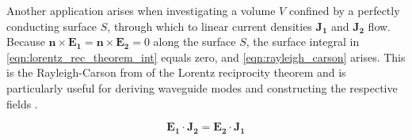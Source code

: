 Another application arises when investigating a volume $V$ confined by a perfectly conducting surface $S$, through which to linear current densities $\mathbf{J_1}$ and $\mathbf{J_2}$ flow. Because $\mathbf{n}\times\mathbf{E_1}=\mathbf{n}\times\mathbf{E_2}=0$ along the surface $S$, the surface integral in \autoref{eqn:lorentz_rec_theorem_int} equals zero, and \autoref{eqn:rayleigh_carson} arises. This is the Rayleigh-Carson from of the Lorentz reciprocity theorem and is particularly useful for deriving waveguide modes and constructing the respective fields \cite{Collin_2015}.

\begin{equation}
    \mathbf{E_1}\cdot\mathbf{J_2}=\mathbf{E_2}\cdot\mathbf{J_1}
    \label{eqn:rayleigh_carson}
\end{equation}

